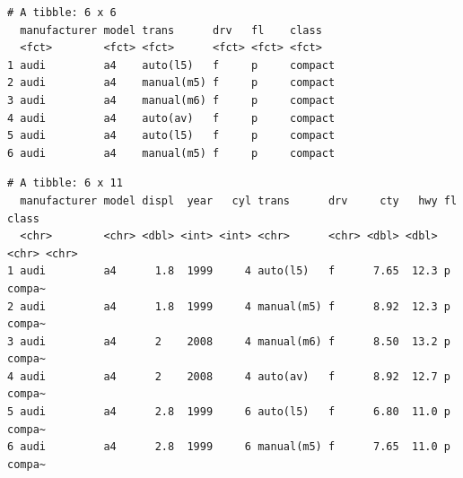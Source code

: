 \documentclass[
  11pt,
]{krantz}
\newenvironment{Shaded}{\begin{snugshade}}{\end{snugshade}}
\newcommand{\CommentTok}[1]{\textcolor[rgb]{0.37,0.37,0.37}{\textit{#1}}}
\newcommand{\KeywordTok}[1]{\textcolor[rgb]{0.27,0.27,0.27}{\textbf{#1}}}
\newcommand{\NormalTok}[1]{#1}
\newcommand{\OperatorTok}[1]{\textcolor[rgb]{0.43,0.43,0.43}{\textbf{#1}}}
\newcommand{\StringTok}[1]{\textcolor[rgb]{0.5,0.5,0.5}{#1}}
\begin{document}
\footnotesize

\begin{Shaded}
\end{Shaded}

\begin{verbatim}
# A tibble: 6 x 6
  manufacturer model trans      drv   fl    class  
  <fct>        <fct> <fct>      <fct> <fct> <fct>  
1 audi         a4    auto(l5)   f     p     compact
2 audi         a4    manual(m5) f     p     compact
3 audi         a4    manual(m6) f     p     compact
4 audi         a4    auto(av)   f     p     compact
5 audi         a4    auto(l5)   f     p     compact
6 audi         a4    manual(m5) f     p     compact
\end{verbatim}

\begin{Shaded}
\end{Shaded}

\begin{verbatim}
# A tibble: 6 x 11
  manufacturer model displ  year   cyl trans      drv     cty   hwy fl    class 
  <chr>        <chr> <dbl> <int> <int> <chr>      <chr> <dbl> <dbl> <chr> <chr> 
1 audi         a4      1.8  1999     4 auto(l5)   f      7.65  12.3 p     compa~
2 audi         a4      1.8  1999     4 manual(m5) f      8.92  12.3 p     compa~
3 audi         a4      2    2008     4 manual(m6) f      8.50  13.2 p     compa~
4 audi         a4      2    2008     4 auto(av)   f      8.92  12.7 p     compa~
5 audi         a4      2.8  1999     6 auto(l5)   f      6.80  11.0 p     compa~
6 audi         a4      2.8  1999     6 manual(m5) f      7.65  11.0 p     compa~
\end{verbatim}
\end{document}
